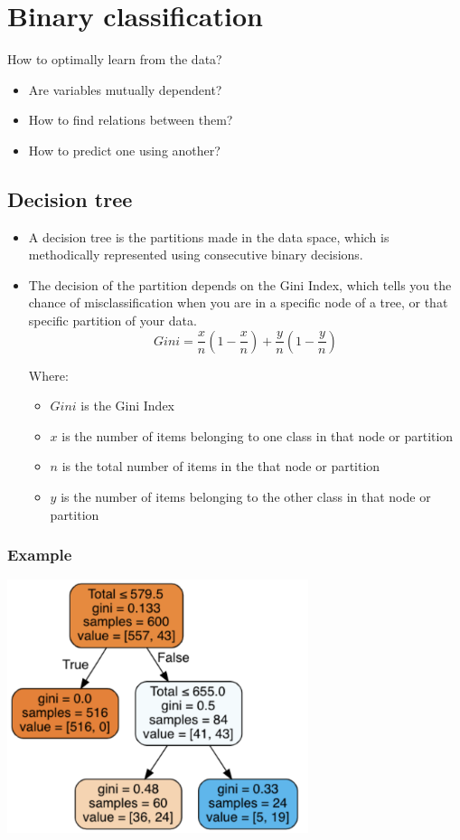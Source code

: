 \documentclass[11pt]{article}
\begin{document}
 \newpage
\section{Binary classification}
\label{sec:org1bda5a4}
How to optimally learn from the data?
\begin{itemize}
\item Are variables mutually dependent?
\item How to find relations between them?
\item How to predict one using another?
\end{itemize}
\subsection{Decision tree}
\label{sec:org8c988c6}
\begin{itemize}
\item A decision tree is the partitions made in the data space, which is methodically represented using consecutive binary decisions.
\item The decision of the partition depends on the Gini Index, which tells you the chance of misclassification when you are in a specific node of a tree, or that specific partition of your data.
\[Gini = \frac{x}{n} \left(1 - \frac{x}{n} \right) + \frac{y}{n} \left(1 - \frac{y}{n} \right)\]

Where:
\begin{itemize}
\item \(Gini\) is the Gini Index
\item \(x\) is the number of items belonging to one class in that node or partition
\item \(n\) is the total number of items in the that node or partition
\item \(y\) is the number of items belonging to the other class in that node or partition
\end{itemize}
\end{itemize}
\subsubsection{Example}
\label{sec:orge2741f3}
\begin{center}
\includegraphics[height=20em]{./images/binary-classification-decision-tree.png}
\end{center}
\end{document}
